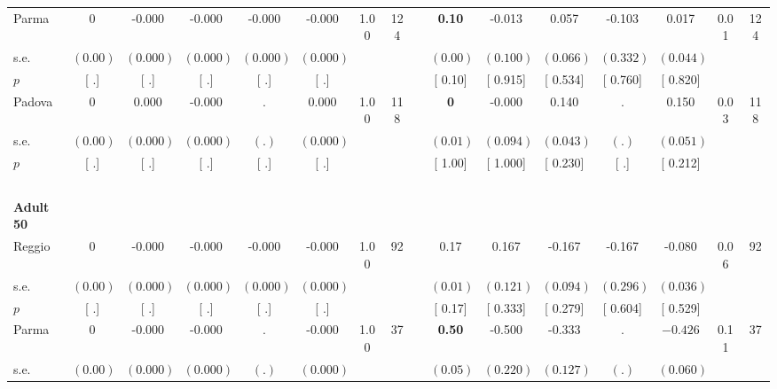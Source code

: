 \begin{longtable}{L{8em} c c c c c c c p{1em} c c c c c c c}
\quad \quad \quad Parma& 0 &    -0.000 &    -0.000 &    -0.000 &    -0.000 &      1.00 &       124 & & \textbf{     0.10} &    -0.013 &     0.057 &    -0.103 &     0.017 &      0.01 &       124  \\*
\quad \quad \quad \quad s.e.& $ (     0.00)$ & $ (    0.000)$ & $ (    0.000)$ & $ (    0.000)$ & $ (    0.000)$ & & & & $ (     0.00)$ & $ (    0.100)$ & $ (    0.066)$ & $ (    0.332)$ & $ (    0.044)$ & &  \\*
\quad \quad \quad \quad $ p$ & [        .] & [        .] & [        .] & [        .] & [        .] & & & & [     0.10] & [    0.915] & [    0.534] & [    0.760] & [    0.820] & &  \\[1em]
\quad \quad \quad Padova& 0 &     0.000 &    -0.000 &         . &     0.000 &      1.00 &       118 & & \textbf{0} &    -0.000 &     0.140 &         . &     0.150 &      0.03 &       118  \\*
\quad \quad \quad \quad s.e.& $ (     0.00)$ & $ (    0.000)$ & $ (    0.000)$ & $ (        .)$ & $ (    0.000)$ & & & & $ (     0.01)$ & $ (    0.094)$ & $ (    0.043)$ & $ (        .)$ & $ (    0.051)$ & &  \\*
\quad \quad \quad \quad $ p$ & [        .] & [        .] & [        .] & [        .] & [        .] & & & & [     1.00] & [    1.000] & [    0.230] & [        .] & [    0.212] & &  \\[1em]
~\\[1em]
\quad \quad \textbf{Adult 50} & & & & & & & & & & & & & & & \\* 
\quad \quad \quad Reggio& 0 &    -0.000 &    -0.000 &    -0.000 &    -0.000 &      1.00 &        92 & & 0.17 &     0.167 &    -0.167 &    -0.167 &    -0.080 &      0.06 &        92  \\*
\quad \quad \quad \quad s.e.& $ (     0.00)$ & $ (    0.000)$ & $ (    0.000)$ & $ (    0.000)$ & $ (    0.000)$ & & & & $ (     0.01)$ & $ (    0.121)$ & $ (    0.094)$ & $ (    0.296)$ & $ (    0.036)$ & &  \\*
\quad \quad \quad \quad $ p$ & [        .] & [        .] & [        .] & [        .] & [        .] & & & & [     0.17] & [    0.333] & [    0.279] & [    0.604] & [    0.529] & &  \\[1em]
\quad \quad \quad Parma& 0 &    -0.000 &    -0.000 &         . &    -0.000 &      1.00 &        37 & & \textbf{     0.50} &    -0.500 &    -0.333 &         . & $ \mathbf{   -0.426}$ &      0.11 &        37  \\*
\quad \quad \quad \quad s.e.& $ (     0.00)$ & $ (    0.000)$ & $ (    0.000)$ & $ (        .)$ & $ (    0.000)$ & & & & $ (     0.05)$ & $ (    0.220)$ & $ (    0.127)$ & $ (        .)$ & $ (    0.060)$ & &  \\*

\end{longtable}
